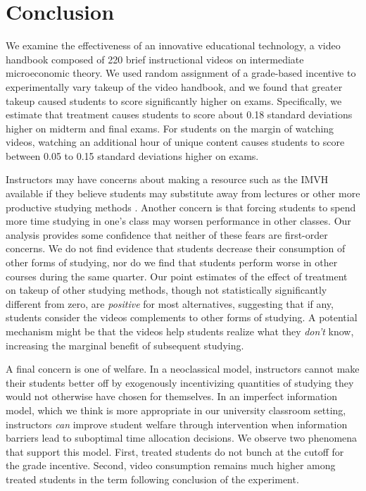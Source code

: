 \documentclass[12pt]{article}
\begin{document}
\section{Conclusion} \label{conclusion}

We examine the effectiveness of an innovative educational technology, a video handbook composed of 220 brief instructional videos on intermediate microeconomic theory. We used random assignment of a grade-based incentive to experimentally vary takeup of the video handbook, and we found that greater takeup caused students to score significantly higher on exams. Specifically, we estimate that treatment causes students to score about 0.18 standard deviations higher on midterm and final exams. For students on the margin of watching videos, watching an additional hour of unique content causes students to score between 0.05 to 0.15 standard deviations higher on exams.

Instructors may have concerns about making a resource such as the IMVH available if they believe students may substitute away from lectures or other more productive studying methods \textcite{kay2012}. Another concern is that forcing students to spend more time studying in one's class may worsen performance in other classes. Our analysis provides some confidence that neither of these fears are first-order concerns. We do not find evidence that students decrease their consumption of other forms of studying, nor do we find that students perform worse in other courses during the same quarter. Our point estimates of the effect of treatment on takeup of other studying methods, though not statistically significantly different from zero, are \textit{positive} for most alternatives, suggesting that if any, students consider the videos complements to other forms of studying. A potential mechanism might be that the videos help students realize what they \textit{don't} know, increasing the marginal benefit of subsequent studying.

A final concern is one of welfare. In a neoclassical model, instructors cannot make their students better off by exogenously incentivizing quantities of studying they would not otherwise have chosen for themselves. In an imperfect information model, which we think is more appropriate in our university classroom setting, instructors \textit{can} improve student welfare through intervention when information barriers lead to suboptimal time allocation decisions. We observe two phenomena that support this model. First, treated students do not bunch at the cutoff for the grade incentive. Second, video consumption remains much higher among treated students in the term following conclusion of the experiment.
\end{document}

